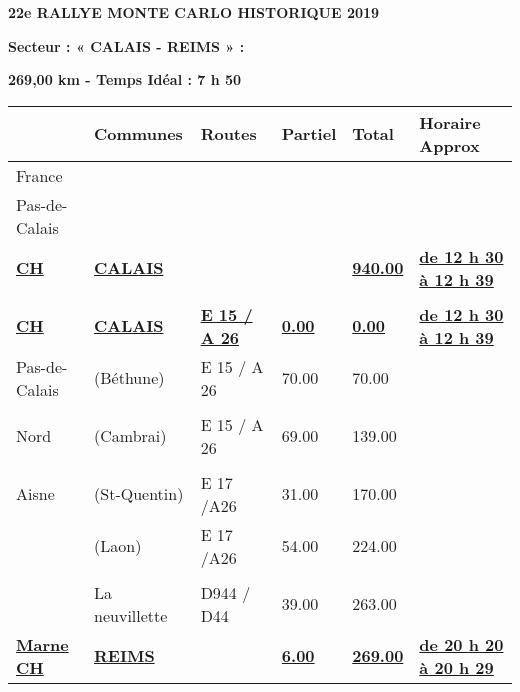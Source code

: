 \documentclass{article}%
\begin{document}
%
\normalsize%
\begin{center} \textbf{\LARGE{22e RALLYE MONTE CARLO HISTORIQUE 2019}} \end{center}%
\begin{flushleft} \textbf{Secteur : « CALAIS - REIMS » :
} \end{flushleft}%
\begin{flushright} \textbf{269,00 km - Temps Idéal : 7 h 50} \end{flushright}%
\begin{longtable}{p{2.25cm}|p{6.7cm}|p{2.0cm}|p{1.5cm}|p{1.5cm}|p{3.5cm}}%
\hline%
&Communes&Routes&Partiel&Total&Horaire Approx\\%
\hline%
\endhead%
\endfoot%
\endlastfoot%
﻿France& & & & & \\%
Pas-de-Calais& & & & & \\%
\textbf{\underline{CH}}&\textbf{\underline{CALAIS}}& & &\textbf{\underline{940.00}}&\textbf{\underline{de 12 h 30 à 12 h 39}}\\%
\hline& & & & & \\%
\textbf{\underline{CH}}&\textbf{\underline{CALAIS}}&\textbf{\underline{E 15 / A 26}}&\textbf{\underline{0.00}}&\textbf{\underline{0.00}}&\textbf{\underline{de 12 h 30 à 12 h 39}}\\%
Pas-de-Calais&(Béthune)&E 15 / A 26&70.00&70.00& \\%
\hline& & & & & \\%
Nord&(Cambrai)&E 15 / A 26&69.00&139.00& \\%
\hline& & & & & \\%
Aisne&(St-Quentin)&E 17 /A26&31.00&170.00& \\%
 &(Laon)&E 17 /A26&54.00&224.00& \\%
\hline& & & & & \\%
 &La neuvillette&D944 / D44&39.00&263.00& \\%
\textbf{\underline{Marne     CH}}&\textbf{\underline{REIMS}}& &\textbf{\underline{6.00}}&\textbf{\underline{269.00}}&\textbf{\underline{de 20 h 20 à 20 h 29}}\\%
\hline%
\end{longtable}%
\begin{flushleft} \textit{} \end{flushleft}%
\end{document}
